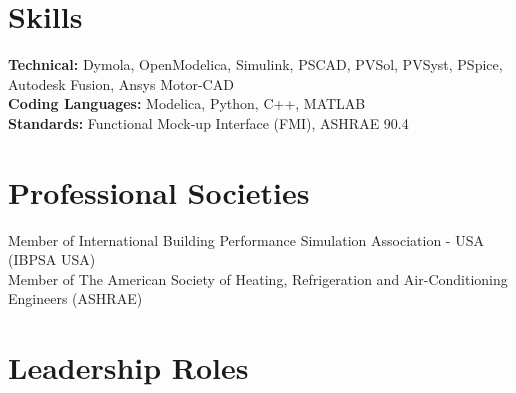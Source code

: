 \documentclass[]{Keval-resume}
\begin{document}
{{\section{Skills} 
\hrulefill
\postsectionsep

\textbullet{} \textbf{Technical:} Dymola, OpenModelica, Simulink, PSCAD, PVSol, PVSyst, PSpice, Autodesk Fusion, Ansys Motor-CAD \\
\textbullet{} \textbf{Coding Languages:} Modelica, Python, C++, MATLAB\\
\textbullet{} \textbf{Standards:} Functional Mock-up Interface (FMI), ASHRAE 90.4

\sectionsep
\sectionsep






\section{Professional Societies} 
\hrulefill
\postsectionsep

\hspace{1.5em} \textbullet{} Member of {International Building Performance Simulation Association - USA (IBPSA USA)} \\
\hspace{1.5em} \textbullet{} Member of {The American Society of Heating, Refrigeration and Air-Conditioning Engineers (ASHRAE)} \\


\sectionsep

\section{Leadership Roles} 
\hrulefill
\postsectionsep

}}
\end{document}
